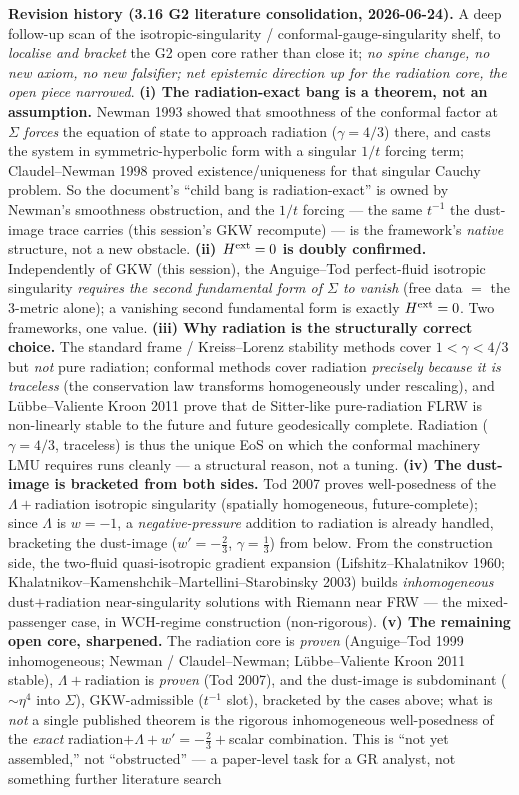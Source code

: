 \documentclass[11pt]{article}
\begin{document}
{\smallskip\noindent\textbf{Revision history (3.16 G2 literature consolidation, 2026-06-24).} A deep follow-up scan of the isotropic-singularity / conformal-gauge-singularity shelf, to \emph{localise and bracket} the G2 open core rather than close it; \emph{no spine change, no new axiom, no new falsifier; net epistemic direction up for the radiation core, the open piece narrowed}. \textbf{(i) The radiation-exact bang is a theorem, not an assumption.} Newman 1993 showed that smoothness of the conformal factor at $\Sigma$ \emph{forces} the equation of state to approach radiation ($\gamma=4/3$) there, and casts the system in symmetric-hyperbolic form with a singular $1/t$ forcing term; Claudel--Newman 1998 proved existence/uniqueness for that singular Cauchy problem. So the document's ``child bang is radiation-exact'' is owned by Newman's smoothness obstruction, and the $1/t$ forcing --- the same $t^{-1}$ the dust-image trace carries (this session's GKW recompute) --- is the framework's \emph{native} structure, not a new obstacle. \textbf{(ii) $H^{\rm ext}=0$ is doubly confirmed.} Independently of GKW (this session), the Anguige--Tod perfect-fluid isotropic singularity \emph{requires the second fundamental form of $\Sigma$ to vanish} (free data $=$ the 3-metric alone); a vanishing second fundamental form is exactly $H^{\rm ext}=0$. Two frameworks, one value. \textbf{(iii) Why radiation is the structurally correct choice.} The standard frame / Kreiss--Lorenz stability methods cover $1<\gamma<4/3$ but \emph{not} pure radiation; conformal methods cover radiation \emph{precisely because it is traceless} (the conservation law transforms homogeneously under rescaling), and L\"ubbe--Valiente Kroon 2011 prove that de Sitter-like pure-radiation FLRW is non-linearly stable to the future and future geodesically complete. Radiation ($\gamma=4/3$, traceless) is thus the unique EoS on which the conformal machinery LMU requires runs cleanly --- a structural reason, not a tuning. \textbf{(iv) The dust-image is bracketed from both sides.} Tod 2007 proves well-posedness of the $\Lambda+$radiation isotropic singularity (spatially homogeneous, future-complete); since $\Lambda$ is $w=-1$, a \emph{negative-pressure} addition to radiation is already handled, bracketing the dust-image ($w'=-\tfrac23$, $\gamma=\tfrac13$) from below. From the construction side, the two-fluid quasi-isotropic gradient expansion (Lifshitz--Khalatnikov 1960; Khalatnikov--Kamenshchik--Martellini--Starobinsky 2003) builds \emph{inhomogeneous} dust$+$radiation near-singularity solutions with Riemann near FRW --- the mixed-passenger case, in WCH-regime construction (non-rigorous). \textbf{(v) The remaining open core, sharpened.} The radiation core is \emph{proven} (Anguige--Tod 1999 inhomogeneous; Newman / Claudel--Newman; L\"ubbe--Valiente Kroon 2011 stable), $\Lambda+$radiation is \emph{proven} (Tod 2007), and the dust-image is subdominant ($\sim\eta^4$ into $\Sigma$), GKW-admissible ($t^{-1}$ slot), bracketed by the cases above; what is \emph{not} a single published theorem is the rigorous inhomogeneous well-posedness of the \emph{exact} radiation$+\Lambda+w'{=}{-}\tfrac23+$scalar combination. This is ``not yet assembled,'' not ``obstructed'' --- a paper-level task for a GR analyst, not something further literature search }
\end{document}
